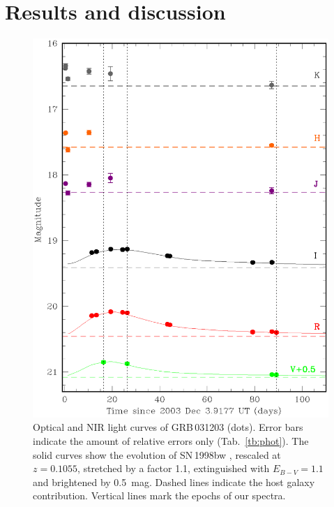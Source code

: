 \documentclass{emulateapj}
\begin{document}
\section{Results and discussion}


\begin{figure}\centering
  \includegraphics[width=\columnwidth]{lc.ps}
  \caption{Optical and NIR light curves of GRB\,031203 (dots). Error
  bars indicate the amount of relative errors only
  (Tab.~\ref{tb:phot}). The solid curves show the evolution of
  SN\,1998bw \citep{Ga98,Mc00}, rescaled at $z = 0.1055$, stretched by a
  factor 1.1, extinguished with $E_{B-V} = 1.1$ and brightened by
  0.5~mag. Dashed lines indicate the host galaxy contribution. Vertical
  lines mark the epochs of our spectra.\label{fg:lc}}
\end{figure}
\end{document}
